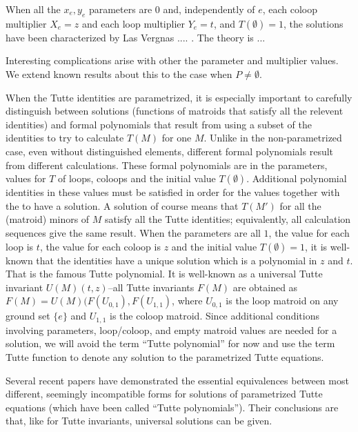 \documentclass[12pt,leqno]{amsart}
\theoremstyle{remark}
\begin{document}
When all the $x_e, y_e$ parameters are $0$ and,
independently of $e$, each coloop multiplier $X_e=z$
and each loop multiplier $Y_e=t$, and $T(\emptyset)=1$, 
the solutions have been characterized by Las Vergnas .... .
The theory is ...

Interesting complications arise with other the parameter and multiplier
values.  We extend known results about this to the case when $P\neq\emptyset$.


When the Tutte identities are parametrized, it is especially important to carefully
distinguish between solutions (functions of matroids that satisfy all the relevent
identities) and formal polynomials that result from using a subset of the 
identities to try to calculate $T(M)$ for one $M$.  Unlike in the non-parametrized
case, even without distinguished elements, different formal polynomials
result from different calculations.  These formal polynomials
are in the parameters, values for $T$ of loops, coloops and the initial value $T(\emptyset)$.
Additional polynomial identities in these
values must be satisfied in order for the values together with the to have 
a solution.  A solution of course means that $T(M')$ for all the (matroid) minors of $M$
satisfy all the Tutte identities; equivalently, all calculation sequences give
the same result.  When the parameters are all $1$, the value for each loop is
$t$, the value for each coloop is $z$ and the initial value $T(\emptyset)=1$,
it is well-known that the identities have a unique solution which is a 
polynomial in $z$ and $t$.  That is the famous Tutte polynomial.  It is well-known
as a universal Tutte invariant $U(M)(t,z)$--all Tutte invariants $F(M)$ are obtained
as $F(M)=U(M)(F(U_{0,1}),F(U_{1,1})$, where $U_{0,1}$ is the loop matroid on 
any ground set $\{e\}$ and $U_{1,1}$ is the coloop matroid.
Since additional
conditions involving parameters, loop/coloop, and empty matroid values are
needed for a solution, we will avoid the term ``Tutte polynomial'' for now
and use the term Tutte function to denote any solution to the parametrized Tutte equations.

Several recent papers have demonstrated the essential equivalences between most
different, seemingly incompatible forms for solutions of parametrized Tutte equations
(which have been called ``Tutte polynomials'').  Their conclusions are that, like
for Tutte invariants, universal solutions can be given.
\end{document}
